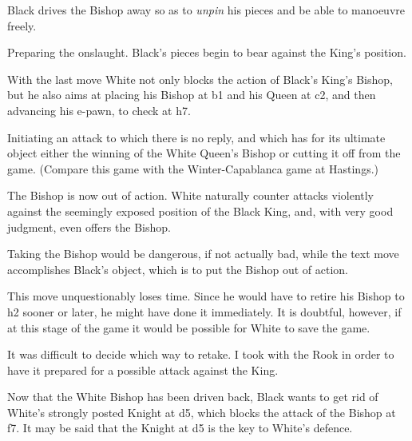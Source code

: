 \documentclass[10pt,twoside]{article}
\begin{document}
Black drives the Bishop away so as to \emph{unpin} his pieces and be able to manoeuvre freely.


Preparing the onslaught. Black's pieces begin to bear against the King's position.


\board

With the last move White not only blocks the action of Black's King's Bishop, but he also aims at placing his Bishop at b1 and his Queen at c2, and then advancing his e-pawn, to check at h7.


Initiating an attack to which there is no reply, and which has for its ultimate object either the winning of the White Queen's Bishop or cutting it off from the game. (Compare this game with the Winter-Capablanca game at Hastings.)


The Bishop is now out of action. White naturally counter attacks violently against the seemingly exposed position of the Black King, and, with very good judgment, even offers the Bishop.

\board


Taking the Bishop would be dangerous, if not actually bad, while the text move accomplishes Black's object, which is to put the Bishop out of action.


This move unquestionably loses time. Since he would have to retire his Bishop to h2 sooner or later, he might have done it immediately. It is doubtful, however, if at this stage of the game it would be possible for White to save the game.


It was difficult to decide which way to retake. I took with the Rook in order to have it prepared for a possible attack against the King.


Now that the White Bishop has been driven back, Black wants to get rid of White's strongly posted Knight at d5, which blocks the attack of the Bishop at f7. It may be said that the Knight at d5 is the key to White's defence.

\board

\end{document}
